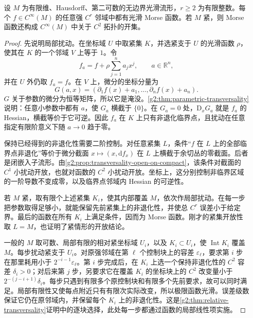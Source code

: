 \begin{theorem}\label{g2:thm:morse-approximation}
	设 \(M\) 为有限维、Hausdorff、第二可数的无边界光滑流形，\(r\ge2\) 为有限整数。每个 \(f\in C^\infty(M)\) 的任意强 \(C^r\) 邻域中都有光滑 Morse 函数。若 \(M\) 紧，则 Morse 函数还构成 \(C^\infty(M)\) 中关于 \(C^2\) 拓扑的开集。
\end{theorem}
\begin{proof}
	先说明局部扰动。在坐标域 \(U\) 中取紧集 \(K\)，并选紧支于 \(U\) 的光滑函数 \(\rho\)，使其在 \(K\) 的一个邻域 \(V\) 上等于 \(1\)。令
	\[
		f_a=f+\rho\sum_{j=1}^n a_jx^j,\qquad a\in\mathbb R^n,
	\]
	并在 \(U\) 外仍取 \(f_a=f\)。在 \(V\) 上，微分的坐标分量为
	\[
		G(a,x)=(\partial_1f(x)+a_1,\ldots,\partial_nf(x)+a_n).
	\]
	\(G\) 关于参数的微分为恒等矩阵，所以它是淹没。\cref{g2:thm:parametric-transversality}说明：任意小参数中都有 \(a\)，使 \(G_a\) 横截于 \(\{0\}\)。在 \(G_a=0\) 处，\(\mathrm D_xG_a\) 就是 \(f_a\) 的 Hessian，横截等价于它可逆。因此 \(f_a\) 在 \(K\) 上只有非退化临界点，且扰动在任意指定有限阶意义下随 \(a\to0\) 趋于零。

	保持已经得到的非退化性需要二阶控制。对任意紧集 \(L\)，条件“\(f\) 在 \(L\) 上的全部临界点非退化”等价于微分截面 \(x\mapsto(x,\mathrm df_x)\) 在 \(L\) 上横截于余切丛的零截面。后者是闭嵌入子流形。由\cref{g2:prop:transversality-open-on-compact}，该条件对截面的 \(C^1\) 小扰动开放，也就对函数的 \(C^2\) 小扰动开放。坐标上，这分别控制非临界区域的一阶导数不变成零，以及临界点邻域内 Hessian 的可逆性。

	若 \(M\) 紧，取有限个上述紧集 \(K_i\)，使其内部覆盖 \(M\)，依次作局部扰动。在每一步把参数取得足够小，就能保留先前紧集上的非退化性，并使总 \(C^r\) 误差小于给定界。最后的函数在所有 \(K_i\) 上满足条件，因而为 Morse 函数。刚才的紧集开放性取 \(L=M\)，也证明了紧情形的开放结论。

	一般的 \(M\) 取可数、局部有限的相对紧坐标域 \(U_i\)，以及 \(K_i\subset U_i\)，使 \(\operatorname{Int}K_i\) 覆盖 \(M\)。每步扰动紧支于 \(U_i\)。对原强邻域在第 \(\ell\) 个控制块上的容差 \(\varepsilon_\ell\)，要求第 \(i\) 步在那里耗用小于 \(2^{-i-1}\varepsilon_\ell\)。第 \(i\) 步完成后，在 \(K_i\) 上选一个保持非退化性的 \(C^2\) 容差 \(\delta_i>0\)；对后来第 \(j\) 步，另要求它在覆盖 \(K_i\) 的坐标块上的 \(C^2\) 改变量小于 \(2^{-(j-i+1)}\delta_i\)。每步只遇到有限多个原控制块和有限多个先前要求，故可以同时满足。局部有限性又使每点附近只有有限次实际改变，所以极限函数光滑。误差级数保证它仍在原邻域内，并保留每个 \(K_i\) 上的非退化性。这是\cref{g2:thm:relative-transversality}证明中的逐块选择，此处每一步都通过函数的局部线性项实施。
\end{proof}

